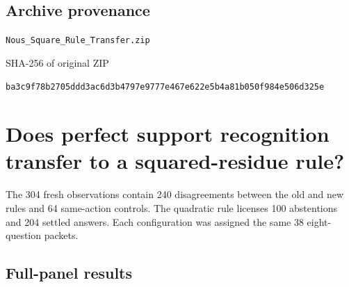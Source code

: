 \documentclass[11pt,letterpaper]{article}
\begin{document}
\subsection*{Archive provenance}

\nolinkurl{Nous_Square_Rule_Transfer.zip}\par

\small\sffamily SHA-256 of original ZIP\par\normalfont\small\nolinkurl{ba3c9f78b2705ddd3ac6d3b4797e9777e467e622e5b4a81b050f984e506d325e}\par

\clearpage\normalsize\tableofcontents\clearpage{}

\section*{Does perfect support recognition transfer to a squared-residue rule?}

The 304 fresh observations contain 240 disagreements between the old and new rules and 64 same-action controls. The quadratic rule licenses 100 abstentions and 204 settled answers. Each configuration was assigned the same 38 eight-question packets.


\subsection{Full-panel results}
\end{document}
